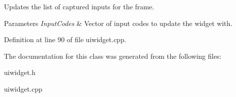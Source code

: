 Updates the list of captured inputs for the frame. 


\begin{DoxyParams}{Parameters}
{\em InputCodes} & Vector of input codes to update the widget with. \\
\hline
\end{DoxyParams}


Definition at line 90 of file uiwidget.cpp.



The documentation for this class was generated from the following files:\begin{DoxyCompactItemize}
\item 
uiwidget.h\item 
uiwidget.cpp\end{DoxyCompactItemize}
